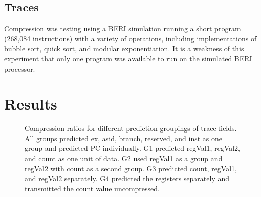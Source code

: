 \documentclass[conference]{IEEEtran}
\begin{document}
\subsection{Traces} %
Compression was testing using a BERI simulation running a short program (268,084 instructions) with a variety of operations, including implementations of bubble sort, quick sort, and modular exponentiation. It is a weakness of this experiment that only one program was available to run on the simulated BERI processor.

\section{Results}

\begin{figure}
\label{group_chart}
\caption{Compression ratios for different prediction groupings of trace fields. All groups predicted ex, asid, branch, reserved, and inst as one group and predicted PC individually. G1 predicted regVal1, regVal2, and count as one unit of data. G2 used regVal1 as a group and regVal2 with count as a second group. G3 predicted count, regVal1, and regVal2 separately. G4 predicted the registers separately and transmitted the count value uncompressed.}
\end{figure}
\end{document}

